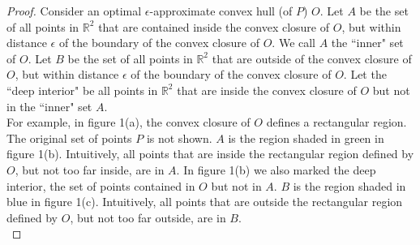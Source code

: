 \begin{proof}
Consider an optimal $\epsilon$-approximate convex hull (of $P$) $O$. Let $A$ be the set of all points in $\mathbb{R}^2$ that are contained inside the convex closure of $O$, but within distance $\epsilon$ of the boundary of the convex closure of $O$. We call $A$ the ``inner" set of $O$. Let $B$ be the set of all points in $\mathbb{R}^2$ that are outside of the convex closure of $O$, but within distance $\epsilon$ of the boundary of the convex closure of $O$. Let the ``deep interior" be all points in $\mathbb{R}^2$ that are inside the convex closure of $O$ but not in the ``inner" set $A$.
\\

For example, in figure 1(a), the convex closure of $O$ defines a rectangular region. The original set of points $P$ is not shown. $A$ is the region shaded in green in figure 1(b). Intuitively, all points that are inside the rectangular region defined by $O$, but not too far inside, are in $A$. In figure 1(b) we also marked the deep interior, the set of points contained in $O$ but not in $A$. $B$ is the region shaded in blue in figure 1(c).  Intuitively, all points that are outside the rectangular region defined by $O$, but not too far outside, are in $B$.
\\


\end{proof}
